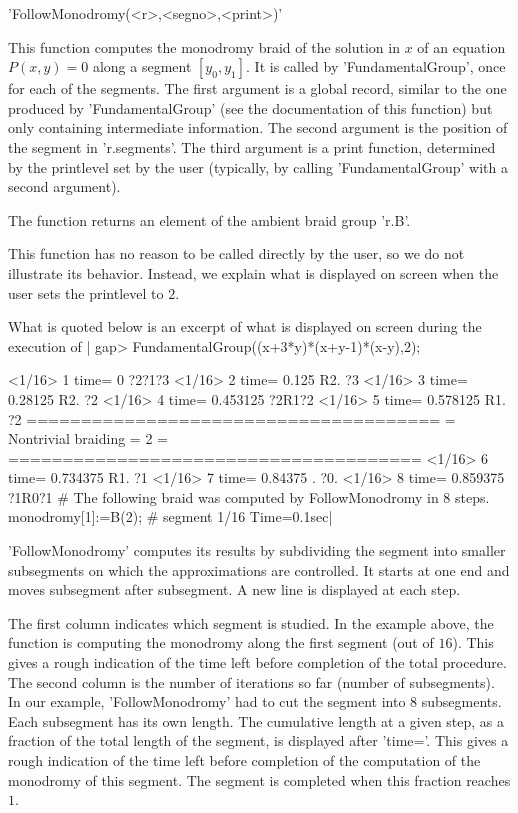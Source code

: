
'FollowMonodromy(<r>,<segno>,<print>)'

This function computes the monodromy braid  of the solution in $x$ of an
equation  $P(x,y)=0$  along  a  segment $[y_0,y_1]$.  It  is  called  by
'FundamentalGroup', once for each of the segments. The first argument is
a global record, similar to  the one produced by 'FundamentalGroup' (see
the  documentation of  this function)  but only  containing intermediate
information.  The second  argument is  the  position of  the segment  in
'r.segments'. The third argument is  a print function, determined by the
printlevel  set by  the user  (typically, by  calling 'FundamentalGroup'
with a second argument).

The function returns an element of the ambient braid group 'r.B'.

This function has no reason to be  called directly by the user, so we do
not illustrate its  behavior. Instead, we explain what  is displayed on
screen when the user sets the printlevel to $2$.

What is quoted below is an excerpt of what is displayed on screen
during the execution of
|    gap>  FundamentalGroup((x+3*y)*(x+y-1)*(x-y),2);

    <1/16>    1 time=          0   ?2?1?3
    <1/16>    2 time=      0.125   R2. ?3
    <1/16>    3 time=    0.28125   R2. ?2
    <1/16>    4 time=   0.453125   ?2R1?2
    <1/16>    5 time=   0.578125   R1. ?2
    ======================================
    =    Nontrivial braiding = 2         =
    ======================================
    <1/16>    6 time=   0.734375   R1. ?1
    <1/16>    7 time=    0.84375   . ?0. 
    <1/16>    8 time=   0.859375   ?1R0?1
    # The following braid was computed by FollowMonodromy in 8 steps.
    monodromy[1]:=B(2);
    # segment 1/16 Time=0.1sec|

'FollowMonodromy' computes  its results by subdividing  the segment into
smaller  subsegments  on which  the  approximations  are controlled.  It
starts at one  end and moves subsegment after subsegment.  A new line is
displayed at each step.

The  first column  indicates which  segment is  studied. In  the example
above, the function  is computing the monodromy along  the first segment
(out  of  $16$).  This  gives  a  rough  indication  of  the  time  left
before  completion of  the total  procedure.  The second  column is  the
number of  iterations so  far (number of  subsegments). In  our example,
'FollowMonodromy'  had to  cut the  segment into  $8$ subsegments.  Each
subsegment has its own length. The cumulative length at a given step, as
a  fraction of  the  total length  of the  segment,  is displayed  after
'time='.  This  gives  a  rough  indication  of  the  time  left  before
completion  of the  computation of  the monodromy  of this  segment. The
segment is completed when this fraction reaches $1$.

